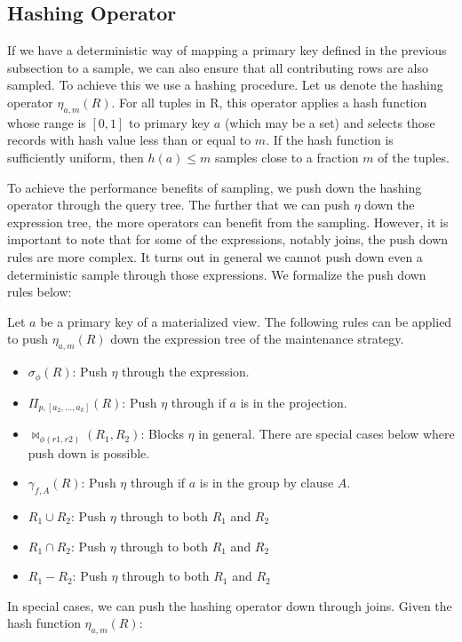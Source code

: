 \subsection{Hashing Operator}
\label{push}
If we have a deterministic way of mapping a primary key defined in the previous subsection to a sample, we can also ensure that all contributing rows are also sampled. 
To achieve this we use a hashing procedure.
Let us denote the hashing operator $\eta_{a, m}(R)$. 
For all tuples in R, this operator applies a hash function whose range is $[0,1]$ to primary key $a$ (which may be a set) and selects those records with hash value less than or equal to $m$.
If the hash function is sufficiently uniform, \reminder{<}then $h(a) \le m$ samples close to a fraction $m$ of the tuples. 

To achieve the performance benefits of sampling, we push down the hashing operator through the query tree.
The further that we can push $\eta$ down the expression tree, the more operators can benefit from the sampling.
However, it is important to note that for some of the expressions, notably joins, the push down rules are more complex. 
It turns out in general we cannot push down even a deterministic sample through those expressions.
We formalize the push down rules below:
\begin{definition}
Let $a$ be a primary key of a materialized view. The following rules can be applied to push $\eta_{a, m}(R)$ down the expression tree of the maintenance strategy. 
\begin{itemize}[noitemsep]
\item $\sigma_{\phi}(R)$: Push $\eta$ through the expression.  
\item $\Pi_{p,[a_2,...,a_k]}(R)$: Push $\eta $ through if $a$ is in the projection.
\item $\bowtie_{\phi (r1,r2)}(R_1,R_2)$: Blocks $\eta $ in general. There are special cases below where push down is possible.
\item $\gamma_{f,A}(R)$: Push $\eta $ through if $a$ is in the group by clause $A$.
\item $R_1 \cup R_2$: Push $\eta $ through to both $R_1$ and $R_2$
\item $R_1 \cap R_2$: Push $\eta $ through to both $R_1$ and $R_2$
\item $R_1 - R_2$: Push $\eta $ through to both $R_1$ and $R_2$
\end{itemize}
\end{definition}
In special cases, we can push the hashing operator down through joins. 
Given the hash function $\eta_{a, m}(R)$:

